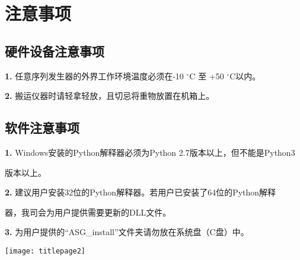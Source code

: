\chapter{\heiti 注意事项}
\section{\heiti 硬件设备注意事项}
\noindent \textbf{1.} 任意序列发生器的外界工作环境温度必须在-10 $^{\circ}$C 至 +50 $^{\circ}$C以内。

\noindent \textbf{2.} 搬运仪器时请轻拿轻放，且切忌将重物放置在机箱上。

\section{\heiti 软件注意事项}
\noindent \textbf{1.} Windows安装的Python解释器必须为Python 2.7版本以上，但不能是Python3

\hspace{-1em}版本以上。

\noindent \textbf{2.} 建议用户安装32位的Python解释器。若用户已安装了64位的Python解释

\hspace{-1em}器，我司会为用户提供需要更新的DLL文件。

\noindent \textbf{3.} 为用户提供的“ASG\_install”文件夹请勿放在系统盘（C盘）中。
%
\newpage
\qquad

\newpage
\qquad
\thispagestyle{empty}

\newpage
\begin{center}
\texttt{[image: titlepage2]}
\end{center}

